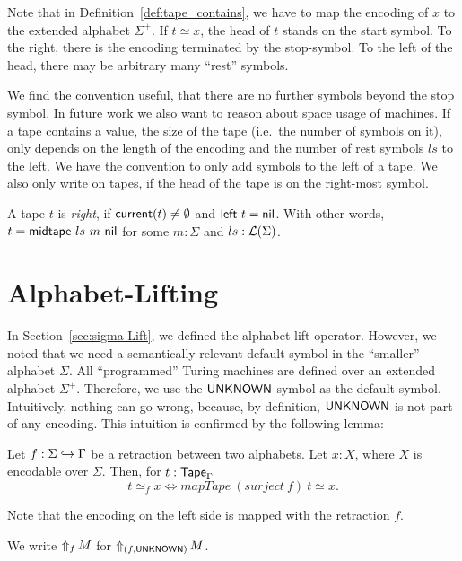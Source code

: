 Note that in Definition~\ref{def:tape_contains}, we have to map the encoding of $x$ to the extended alphabet $\Sigma^+$.  If $t \simeq x$, the head of
$t$ stands on the start symbol.  To the right, there is the encoding terminated by the stop-symbol.  To the left of the head, there may be arbitrary
many ``rest'' symbols.

We find the convention useful, that there are no further symbols beyond the stop symbol.  In future work we also want to reason about space usage of
machines.  If a tape contains a value, the size of the tape (i.e.\ the number of symbols on it), only depends on the length of the encoding and the
number of rest symbols $ls$ to the left.  We have the convention to only add symbols to the left of a tape.  We also only write on tapes, if the head
of the tape is on the right-most symbol.

\begin{definition}
  \label{def:isRght}
  A tape $t$ is \emph{right}, if $\MS{current}(t) \neq \None$ and $\MS{left}~t=\nil$.  With other words, $t = \MS{midtape}~ls~m~\nil$ for some
  $m:\Sigma$ and $ls:\List(\Sigma)$.
\end{definition}

\section{Alphabet-Lifting}
\label{sec:LiftAlphabet-UNKNOWN}

In Section~\ref{sec:sigma-Lift}, we defined the alphabet-lift operator.  However, we noted that we need a semantically relevant default symbol in the
``smaller'' alphabet $\Sigma$.  All ``programmed'' Turing machines are defined over an extended alphabet $\Sigma^+$.  Therefore, we use the
$\MS{UNKNOWN}$ symbol as the default symbol.  Intuitively, nothing can go wrong, because, by definition, $\MS{UNKNOWN}$ is not part of any encoding.
This intuition is confirmed by the following lemma:
\begin{lemma}
  \label{lem:contains_translate_tau}
  Let $f: \Sigma \hookrightarrow \Tau$ be a retraction between two alphabets.  Let $x:X$, where $X$ is encodable over $\Sigma$. Then, for
  $t:\Tape_\Tau$
  \[
    t \simeq_f x \iff mapTape~(surject~f)~t \simeq x.
  \]
\end{lemma}
Note that the encoding on the left side is mapped with the retraction $f$.

We write $\LiftAlphabet{M}{f}$ for $\LiftAlphabet{M}{(f, \MS{UNKNOWN})}$.

